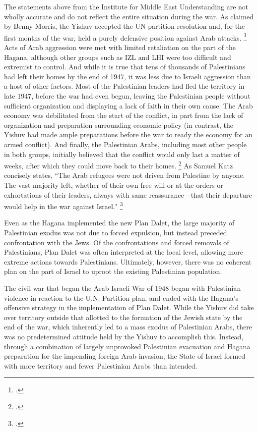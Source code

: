 \documentclass[12pt]{turabian-researchpaper}
\begin{document}
The statements above from the Institute for Middle East Understanding are not wholly accurate and do not reflect the entire situation during the war.  As claimed by Benny Morris, the Yishuv accepted the UN partition resolution and, for the first months of the war, held a purely defensive position against Arab attacks.
\footcite[][98-100]{morris}
Acts of Arab aggression were met with limited retaliation on the part of the Hagana, although other groups such as IZL and LHI were too difficult and extremist to control.
And while it is true that tens of thousands of Palestinians had left their homes by the end of 1947, it was less due to Israeli aggression than a host of other factors.  Most of the Palestinian leaders had fled the territory in late 1947, before the war had even begun, leaving the Palestinian people without sufficient organization and displaying a lack of faith in their own cause.  The Arab economy was debilitated from the start of the conflict, in part from the lack of organization and preparation surrounding economic policy (in contrast, the Yishuv had made ample preparations before the war to ready the economy for an armed conflict). And finally, the Palestinian Arabs, including most other people in both groups, initially believed that the conflict would only last a matter of weeks, after which they could move back to their homes.
\footcite[][84-85]{pappe}
As Samuel Katz concisely states, ``The Arab refugees were not driven from Palestine by anyone. The vast majority left, whether of their own free will or at the orders or exhortations of their leaders, always with same reassurance—that their departure would help in the war against Israel."
\footcite[][64]{dajani}



Even as the Hagana implemented the new Plan Dalet, the large majority of Palestinian exodus was not due to forced expulsion, but instead preceded confrontation with the Jews.  Of the confrontations and forced removals of Palestinians, Plan Dalet was often interpreted at the local level, allowing more extreme actions towards Palestinians.  Ultimately, however, there was no coherent plan on the part of Israel to uproot the existing Palestinian population.



The civil war that began the Arab Israeli War of 1948 began with Palestinian violence in reaction to the U.N. Partition plan, and ended with the Hagana's offensive strategy in the implementation of Plan Dalet.  While the Yishuv did take over territory outside that allotted to the formation of the Jewish state by the end of the war, which inherently led to a mass exodus of Palestinian Arabs, there was no predetermined attitude held by the Yishuv to accomplish this.  Instead, through a combination of largely unprovoked Palestinian evacuation and Hagana preparation for the impending foreign Arab invasion, the State of Israel formed with more territory and fewer Palestinian Arabs than intended.
\end{document}
